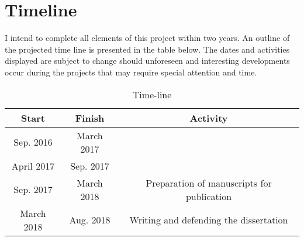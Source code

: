 \documentclass[12pt, preprint,letterpaper]{article}
\begin{document}
\section{Timeline}
I intend to complete all elements of this project within two years.
An outline of the projected time line is presented in the table below.
The dates and activities displayed are subject to change should
unforeseen and interesting developments occur during the projects that
may require special attention and time.
\begin{table}[h]
\caption{Time-line}
\vspace{5mm}
\centering
        \begin{tabular}{|c|c|c|}
            \hline
            Start&Finish&Activity\\
            \hline
            Sep. 2016& March 2017 &  \\
            \hline
            April 2017 & Sep. 2017 &   \\
            \hline
            Sep. 2017 & March 2018 & Preparation of manuscripts for publication \\
            \hline
            March 2018 & Aug. 2018& Writing and defending the dissertation   \\
            \hline
            \end{tabular}
\end{table}
%
%
%
%
\newpage


\end{document}

